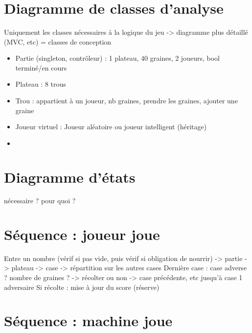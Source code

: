 \documentclass{article}
\begin{document}
    \newpage
    \section{Diagramme de classes d'analyse}

    \paragraph{}
    Uniquement les classes nécessaires à la logique du jeu -> diagramme plus détaillé (MVC, etc) = classes de conception

    \begin{itemize}
        \item Partie (singleton, contrôleur) : 1 plateau, 40 graines, 2 joueurs, bool terminé/en cours
        \item Plateau : 8 trous
        \item Trou : appartient à un joueur, nb graines, prendre les graines, ajouter une graine
        \item Joueur virtuel : Joueur aléatoire ou joueur intelligent (héritage)
        \item 
    \end{itemize}


    \newpage
    \section{Diagramme d'états}

    \paragraph{}
    nécessaire ? pour quoi ?


    \newpage
    \section{Séquence : joueur joue}

    \paragraph{}
    Entre un nombre (vérif si pas vide, puis vérif si obligation de nourrir) -> partie -> plateau -> case -> répartition sur les autres cases
    Dernière case : case adverse ? nombre de graines ? -> récolter ou non -> case précédente, etc jusqu'à case 1 adversaire
    Si récolte : mise à jour du score (réserve)

    \newpage
    \section{Séquence : machine joue}
\end{document}

